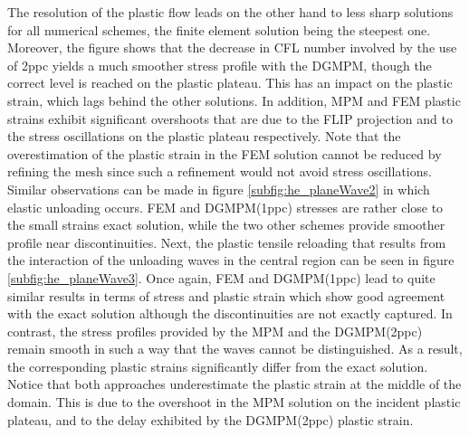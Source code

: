 The resolution of the plastic flow leads on the other hand to less sharp solutions for all numerical schemes, the finite element solution being the steepest one.
Moreover, the figure shows that the decrease in CFL number involved by the use of 2ppc yields a much smoother stress profile with the DGMPM, though the correct level is reached on the plastic plateau.
This has an impact on the plastic strain, which lags behind the other solutions.
In addition, MPM and FEM plastic strains exhibit significant overshoots that are due to the FLIP projection \cite{Thesis} and to the stress oscillations on the plastic plateau respectively.
Note that the overestimation of the plastic strain in the FEM solution cannot be reduced by refining the mesh since such a refinement would not avoid stress oscillations.
%
Similar observations can be made in figure \ref{subfig:he_planeWave2} in which elastic unloading occurs.
FEM and DGMPM(1ppc) stresses are rather close to the small strains exact solution, while the two other schemes provide smoother profile near discontinuities.
%
Next, the plastic tensile reloading that results from the interaction of the unloading waves in the central region can be seen in figure \ref{subfig:he_planeWave3}.
Once again, FEM and DGMPM(1ppc) lead to quite similar results in terms of stress and plastic strain which show good agreement with the exact solution although the discontinuities are not exactly captured.
In contrast, the stress profiles provided by the MPM and the DGMPM(2ppc) remain smooth in such a way that the waves cannot be distinguished.
As a result, the corresponding plastic strains significantly differ from the exact solution.
Notice that both approaches underestimate the plastic strain at the middle of the domain.
This is due to the overshoot in the MPM solution on the incident plastic plateau, and to the delay exhibited by the DGMPM(2ppc) plastic strain.

